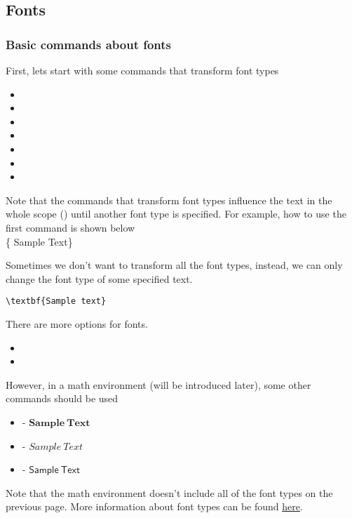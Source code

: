 \subsection{Fonts}

\begin{frame}
	\frametitle{Basic commands about fonts}
	First, lets start with some commands that transform font types
	\begin{itemize}
		\item {}
		\item {}
		\item {}
		\item {}
		\item {}
		\item {}
		\item {}
	\end{itemize}
	Note that the commands that transform font types influence the text in the whole scope () until another font type is specified. For example, how to use the first command  is shown below\\[0.5em]
	\{ Sample Text\}
\end{frame}

\begin{frame}[fragile]
	Sometimes we don't want to transform  all the font types, instead, we can only change the font type of some specified text.
	\begin{example}
		\begin{verbatim}
\textbf{Sample text}
		\end{verbatim}
	\end{example}
	There are more options for fonts.
	\begin{itemize}
		\item {}
		\item {}
	\end{itemize}
	However, in a math environment (will be introduced later), some other commands should be used
	\begin{itemize}
		\item {} - $\mathbf{Sample\ Text}$
		\item {} - $\mathit{Sample\ Text}$
		\item {} - $\mathsf{Sample\ Text}$
	\end{itemize}
	Note that the math environment doesn't include all of the font types on the previous page. More information about font types can be found \href{http://www.cnblogs.com/make217/p/6123532.html}{\color{blue}\underline{here}}.
\end{frame}

